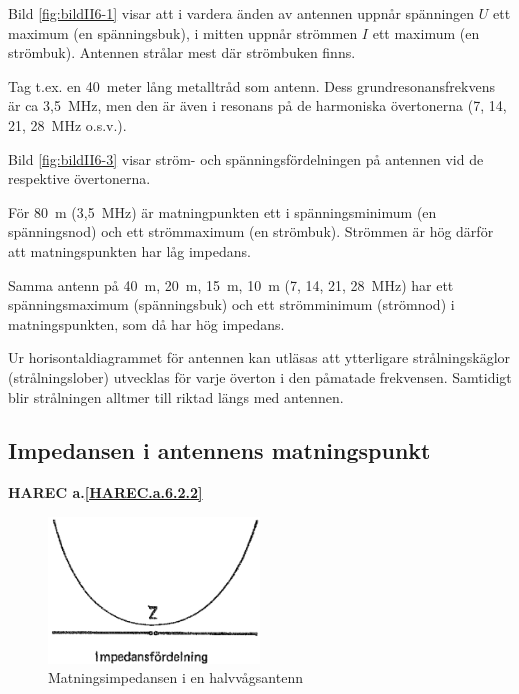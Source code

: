 Bild \ref{fig:bildII6-1} visar att i vardera änden av antennen uppnår spänningen
\(U\) ett maximum (en spänningsbuk), i mitten uppnår strömmen \(I\)
ett maximum (en strömbuk).
Antennen strålar mest där strömbuken finns.

Tag t.ex. en 40~meter lång metalltråd som antenn.
Dess grundresonansfrekvens är ca 3,5~MHz, men den är även i resonans på de
harmoniska övertonerna (7, 14, 21, 28~MHz o.s.v.).

Bild \ref{fig:bildII6-3} visar ström- och spänningsfördelningen på antennen vid
de respektive övertonerna.

För 80~m (3,5~MHz) är matningpunkten ett i spänningsminimum (en spänningsnod)
och ett strömmaximum (en strömbuk).
Strömmen är hög därför att matningspunkten har låg impedans.

Samma antenn på 40~m, 20~m, 15~m, 10~m (7, 14, 21, 28~MHz) har ett
spänningsmaximum (spänningsbuk) och ett strömminimum (strömnod) i
matningspunkten, som då har hög impedans.

Ur horisontaldiagrammet för antennen kan utläsas att ytterligare
strålningskäglor (strålningslober) utvecklas för varje överton i den
påmatade frekvensen.
Samtidigt blir strålningen alltmer till riktad längs med antennen.

\subsection{Impedansen i antennens matningspunkt}
\textbf{
HAREC a.\ref{HAREC.a.6.2.2}\label{myHAREC.a.6.2.2}
}

\begin{figure}
  \includegraphics[width=0.5\textwidth]{images/cropped_pdfs/bild_2_6-02.pdf}
  \caption{Matningsimpedansen i en halvvågsantenn}
  \label{fig:bildII6-2}
\end{figure}

